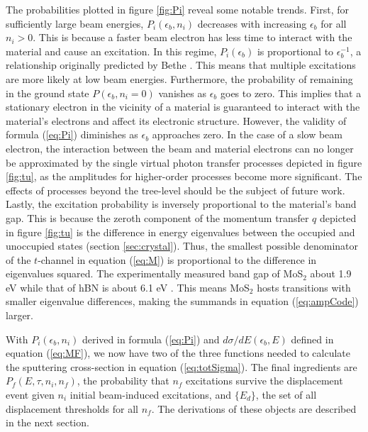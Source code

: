 \documentclass{article}
\begin{document}
The probabilities plotted in figure \ref{fig:Pi} reveal some notable
trends.
First, for sufficiently large beam energies, $P_i(\epsilon_b, n_i)$ decreases
with increasing $\epsilon_b$ for all $n_i>0$.
This is because a faster beam electron has less time to interact with the
material and cause an excitation.
In this regime, $P_i(\epsilon_b)$ is proportional to $\epsilon_b^{-1}$, a
relationship originally predicted by Bethe \cite{Bethe1930, Inokuti1967,
Kretschmer2020}.
This means that multiple excitations are more likely at low beam energies.
Furthermore, the probability of remaining in the ground state $P(\epsilon_b,
n_i=0)$ vanishes as $\epsilon_b$ goes to zero.
This implies that a stationary electron in the vicinity of a material is
guaranteed to interact with the material's electrons and affect its electronic
structure.
However, the validity of formula (\ref{eq:Pi}) diminishes as $\epsilon_b$
approaches zero.
In the case of a slow beam electron, the interaction between the beam and
material electrons can no longer be approximated by the single virtual photon
transfer processes depicted in figure \ref{fig:tu}, as the amplitudes for
higher-order processes become more significant.
The effects of processes beyond the tree-level should be the subject of future
work.
Lastly, the excitation probability is inversely proportional to the material's
band gap.
This is because the zeroth component of the momentum transfer $q$ depicted in
figure \ref{fig:tu} is the difference in energy eigenvalues between the
occupied and unoccupied states (section \ref{sec:crystal}).
Thus, the smallest possible denominator of the $t$-channel in equation
(\ref{eq:M}) is proportional to the difference in eigenvalues squared.
The experimentally measured band gap of MoS$_2$ about 1.9 eV \cite{Gusakova2017}
while that of hBN is about 6.1 eV \cite{Elias2019}.
This means MoS$_2$ hosts transitions with smaller eigenvalue differences,
making the summands in equation (\ref{eq:ampCode}) larger.

With $P_i(\epsilon_b, n_i)$ derived in formula (\ref{eq:Pi}) and
$d\sigma/dE(\epsilon_b, E)$ defined in equation (\ref{eq:MF}), we now have two
of the three functions needed to calculate the sputtering cross-section in
equation (\ref{eq:totSigma}).
The final ingredients are $P_f(E, \tau, n_i, n_f)$, the probability that $n_f$
excitations survive the displacement event given $n_i$ initial beam-induced
excitations, and $\{E_d\}$, the set of all displacement thresholds for all
$n_f$.
The derivations of these objects are described in the next section.
\end{document}
